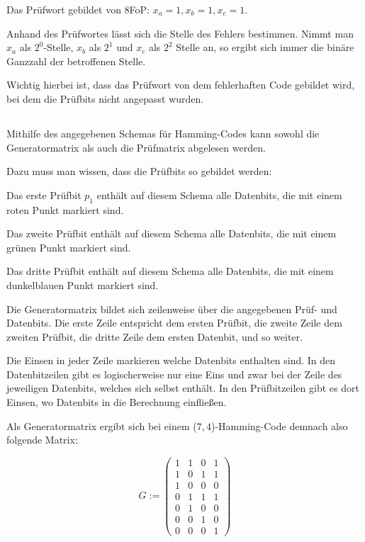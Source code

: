 \documentclass[10pt,a4paper,oneside,ngerman,numbers=noenddot]{scrartcl}
\begin{document}
Das Prüfwort gebildet von 8FoP: $x_{a} = 1, x_{b} = 1, x_{c} = 1$.

Anhand des Prüfwortes lässt sich die Stelle des Fehlers bestimmen. Nimmt man $x_{a}$ als $2^{0}$-Stelle, $x_{b}$ als $2^{1}$ und $x_{c}$ als $2^{2}$ Stelle an, so ergibt sich immer die binäre Ganzzahl der betroffenen Stelle.

Wichtig hierbei ist, dass das Prüfwort von dem fehlerhaften Code gebildet wird, bei dem die Prüfbits nicht angepasst wurden.
\subsection{} %
Mithilfe des angegebenen Schemas für Hamming-Codes kann sowohl die Generatormatrix als auch die Prüfmatrix abgelesen werden.

Dazu muss man wissen, dass die Prüfbits so gebildet werden:

Das erste Prüfbit $p_{1}$ enthält auf diesem Schema alle Datenbits, die mit einem roten Punkt markiert sind.

Das zweite Prüfbit enthält auf diesem Schema alle Datenbits, die mit einem grünen Punkt markiert sind.

Das dritte Prüfbit enthält auf diesem Schema alle Datenbits, die mit einem dunkelblauen Punkt markiert sind.

Die Generatormatrix bildet sich zeilenweise über die angegebenen Prüf- und Datenbits. Die erste Zeile entspricht dem ersten Prüfbit, die zweite Zeile dem zweiten Prüfbit, die dritte Zeile dem ersten Datenbit, und so weiter.

Die Einsen in jeder Zeile markieren welche Datenbits enthalten sind. In den Datenbitzeilen gibt es logischerweise nur eine Eins und zwar bei der Zeile des jeweiligen Datenbits, welches sich selbst enthält. In den Prüfbitzeilen gibt es dort Einsen, wo Datenbits in die Berechnung einfließen.

Als Generatormatrix ergibt sich bei einem ($7,4$)-Hamming-Code demnach also folgende Matrix:

\begin{equation*}
G := \begin{pmatrix} 1 & 1 & 0 & 1 \\ 1 & 0 & 1 & 1 \\ 1 & 0 & 0 & 0 \\ 0 & 1 & 1 & 1 \\ 0 & 1 & 0 & 0 \\ 0 & 0 & 1 & 0 \\ 0 & 0 & 0 & 1 \end{pmatrix}
\end{equation*}
\end{document}
